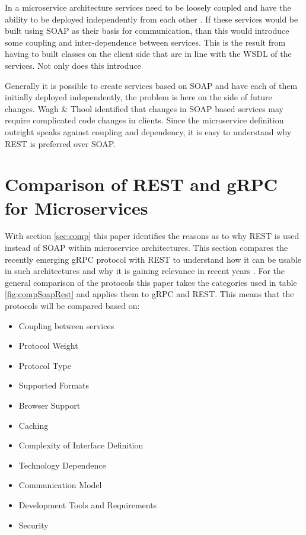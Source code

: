 \documentclass[conference]{IEEEtran}
\begin{document}
In a microservice architecture services need to be loosely coupled and have the ability to be deployed independently from each other \cite{karmel2016nist}. If these services would be built using SOAP as their basis for communication, than this would introduce some coupling and inter-dependence between services. This is the result from having to built classes on the client side that are in line with the WSDL of the services. Not only does this introduce

Generally it is possible to create services based on SOAP and have each of them initially deployed independently, the problem is here on the side of future changes. Wagh \& Thool \cite{wagh2012comparative} identified that changes in SOAP based services may require complicated code changes in clients. Since the microservice definition outright speaks against coupling and dependency, it is easy to understand why REST is preferred over SOAP.

\section{Comparison of REST and gRPC for Microservices}
\label{sec:compgrpc}

With section \ref{sec:comp} this paper identifies the reasons as to why REST is used instead of SOAP within microservice architectures. This section compares the recently emerging gRPC protocol with REST to understand how it can be usable in such architectures and why it is gaining relevance in recent years \cite{grpcrest}. For the general comparison of the protocols this paper takes the categories used in table \ref{fig:compSoapRest} and applies them to gRPC and REST. This means that the protocols will be compared based on:

\begin{itemize}
	\item Coupling between services
	\item Protocol Weight
	\item Protocol Type
	\item Supported Formats
	\item Browser Support
	\item Caching
	\item Complexity of Interface Definition
	\item Technology Dependence
	\item Communication Model
	\item Development Tools and Requirements
	\item Security
\end{itemize}
\end{document}
